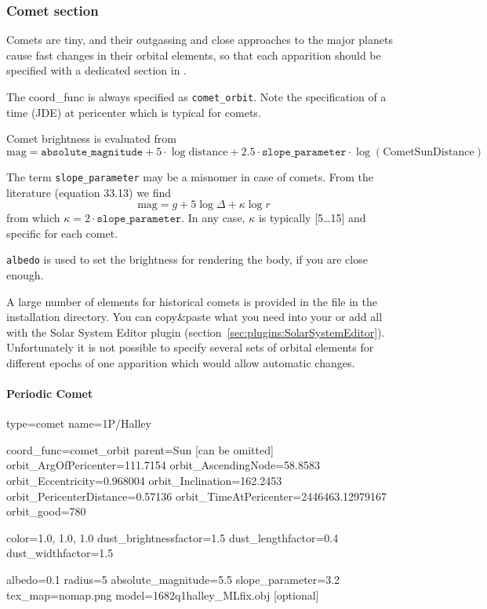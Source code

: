 \subsubsection{Comet section}
\label{sec:ssystem.ini:Comet}

Comets are tiny, and their outgassing and close approaches to the
major planets cause fast changes in their orbital elements, so that
each apparition should be specified with a dedicated section in
. 

The coord\_func is always specified as \texttt{comet\_orbit}.  Note the
specification of a time (JDE) at pericenter which is typical for
comets.

Comet brightness is evaluated from
\begin{equation}
  \label{eq:comet_magnitudes}
  \mathrm{mag}=\mathtt{absolute\_magnitude}+5\cdot\log{\mathrm{distance}} + 2.5\cdot\mathtt{slope\_parameter}\cdot\log(\mathrm{CometSunDistance})
\end{equation}

The term \texttt{slope\_parameter} may be a misnomer in case of
comets. From the literature \cite{AstronomicalAlgorithms:1998} (equation 33.13) we find
\begin{equation}
  \label{eq:comet_magnitudes_Meeus}
  \mathrm{mag}=g+5\log\Delta + \kappa\log r
\end{equation}
from which $\kappa=2\cdot\mathtt{slope\_parameter}$. In any case, $\kappa$ is typically [5\ldots15] and specific for each comet.

\texttt{albedo} is used to set the brightness for rendering the body,
if you are close enough. 

A large number of elements for historical comets is provided in the
file  in the installation directory. You
can copy\&paste what you need into your
 or add all with the Solar System Editor plugin (section~\ref{sec:plugins:SolarSystemEditor}). 
Unfortunately it is not possible to specify
several sets of orbital elements for different epochs of one apparition which would
allow automatic changes.

\paragraph{Periodic Comet}
\label{sec:ssystem.ini:Comet:Periodic}

\begin{configfile}
[1phalley]
type=comet  
name=1P/Halley

coord_func=comet_orbit
parent=Sun [can be omitted]
orbit_ArgOfPericenter=111.7154
orbit_AscendingNode=58.8583
orbit_Eccentricity=0.968004
orbit_Inclination=162.2453
orbit_PericenterDistance=0.57136
orbit_TimeAtPericenter=2446463.12979167
orbit_good=780

color=1.0, 1.0, 1.0
dust_brightnessfactor=1.5
dust_lengthfactor=0.4
dust_widthfactor=1.5

albedo=0.1
radius=5
absolute_magnitude=5.5
slope_parameter=3.2
tex_map=nomap.png
model=1682q1halley_MLfix.obj [optional]
\end{configfile}

